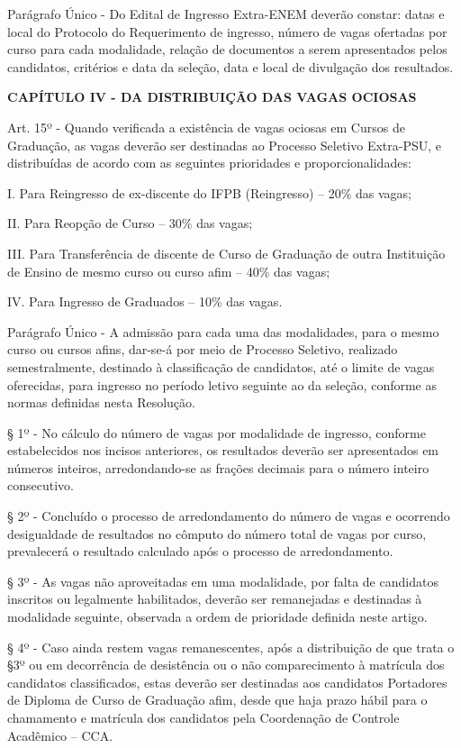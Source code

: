 Parágrafo Único - Do Edital de Ingresso Extra-ENEM deverão constar: datas e local do Protocolo do Requerimento de ingresso, número de vagas ofertadas por curso para cada modalidade, relação de documentos a serem apresentados pelos candidatos, critérios e data da seleção, data e local de divulgação dos resultados.

\vspace{4mm}
\textbf{CAPÍTULO IV - DA DISTRIBUIÇÃO DAS VAGAS OCIOSAS}
\vspace{4mm}

Art. 15º - Quando verificada a existência de vagas ociosas em Cursos de Graduação, as vagas deverão ser destinadas ao Processo Seletivo Extra-PSU, e distribuídas de acordo com as seguintes prioridades e proporcionalidades:

I. Para Reingresso de ex-discente do IFPB (Reingresso) – 20\% das vagas;

II. Para Reopção de Curso – 30\% das vagas;

III. Para Transferência de discente de Curso de Graduação de outra Instituição de Ensino de mesmo curso ou curso afim – 40\% das vagas;

IV. Para Ingresso de Graduados – 10\% das vagas.

Parágrafo Único - A admissão para cada uma das modalidades, para o mesmo curso ou cursos afins, dar-se-á por meio de Processo Seletivo, realizado semestralmente, destinado à classificação de candidatos, até o limite de vagas oferecidas, para ingresso no período letivo seguinte ao da seleção, conforme as normas definidas nesta Resolução.

§ 1º - No cálculo do número de vagas por modalidade de ingresso, conforme estabelecidos nos incisos anteriores, os resultados deverão ser apresentados em números inteiros, arredondando-se as frações decimais para o número inteiro consecutivo.

§ 2º - Concluído o processo de arredondamento do número de vagas e ocorrendo desigualdade de resultados no cômputo do número total de vagas por curso, prevalecerá o resultado calculado após o processo de arredondamento.

§ 3º - As vagas não aproveitadas em uma modalidade, por falta de candidatos inscritos ou legalmente habilitados, deverão ser remanejadas e destinadas à modalidade seguinte, observada a ordem de prioridade definida neste artigo.

§ 4º - Caso ainda restem vagas remanescentes, após a distribuição de que trata o §3º ou em decorrência de desistência ou o não comparecimento à matrícula dos candidatos classificados, estas deverão ser destinadas aos candidatos Portadores de Diploma de Curso de Graduação afim, desde que haja prazo hábil para o chamamento e matrícula dos candidatos pela Coordenação de Controle Acadêmico – CCA.

